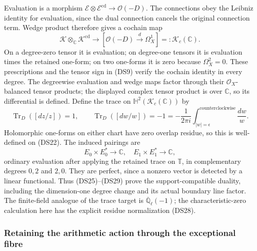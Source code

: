 Evaluation is a morphism
$\mathscr E\otimes\mathscr E^{\mathrm{cd}}\to\mathcal O(-D)$.
The connections obey the Leibniz identity for evaluation, since the
dual connection cancels the original connection term.  Wedge product
therefore gives a cochain map
\[
 \mathscr K\otimes_{\mathbb C}\mathscr K^{\mathrm{cd}}
 \longrightarrow [\mathcal O(-D)\xrightarrow d\Omega_X^1]
 =:\mathscr K_c(\mathbb C).
 \tag{DS27}
\]
On a degree-zero tensor it is evaluation; on degree-one tensors it
is evaluation times the retained one-form; on two one-forms it is
zero because $\Omega_X^2=0$.  These prescriptions and the tensor
sign in (DS9) verify the cochain identity in every degree.
The degreewise evaluation and wedge maps factor through their
$\mathcal O_X$-balanced tensor products; the displayed complex
tensor product is over $\mathbb C$, so its differential is defined.
Define the trace on $\mathbb H^2(\mathscr K_c(\mathbb C))$ by
\[
 \operatorname{Tr}_D([dz/z])=1,\qquad
 \operatorname{Tr}_D([dw/w])=-1
 =-\frac1{2\pi i}\int_{|w|=\epsilon}^{\mathrm{counterclockwise}}\frac{dw}{w}.
 \tag{DS28}
\]
Holomorphic one-forms on either chart have zero overlap residue, so
this is well-defined on (DS22).  The induced pairings are
\[
 E_0\times E_0^*\to\mathbb C,
 \quad E_1\times E_1^*\to\mathbb C,
 \tag{DS29}
\]
ordinary evaluation after applying the retained trace on $\mathbb T$,
in complementary degrees $0,2$ and $2,0$.
They are perfect, since a nonzero vector is detected by a linear
functional.  Thus (DS25)--(DS29) prove the support-compatible
duality, including the dimension-one degree change and its actual
boundary line factor.  The finite-field analogue of the trace target
is $\overline{\mathbb Q}_\ell(-1)$; the characteristic-zero calculation
here has the explicit residue normalization (DS28).

\subsubsection{Retaining the arithmetic action through the exceptional fibre}

